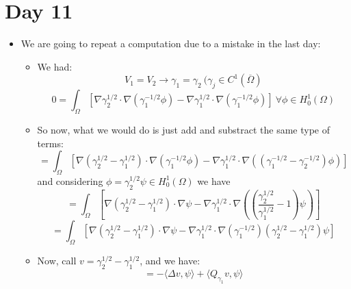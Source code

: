 \documentclass{article}
\begin{document}
\section*{Day 11}
\begin{itemize}
    \item We are going to repeat a computation due to a mistake in the last day:
    \begin{itemize}
        \item We had:
        \begin{equation}
            V_1 = V_2 \rightarrow \gamma_1 = \gamma_2 \ (\gamma_j  \in C^1(\overline{\Omega})
        \end{equation}
        \begin{equation}
            0 = \int_\Omega [\nabla \gamma^{1/2}_2 \cdot \nabla (\gamma^{-1/2}_1 \phi) - \nabla \gamma^{1/2}_1 \cdot \nabla (\gamma^{-1/2}_1 \phi) ] \ \forall \phi \in H^1_0 (\Omega)
        \end{equation}
    
        \item So now, what we would do is just add and substract the same type of terms:
        \begin{equation}
            = \int_\Omega [\nabla (\gamma^{1/2}_2 - \gamma^{1/2}_1) \cdot \nabla (\gamma^{-1/2}_1 \phi) - \nabla \gamma^{1/2}_1 \cdot \nabla ((\gamma^{-1/2}_1 - \gamma^{-1/2}_2)  \phi) ]
        \end{equation}
        and considering $\phi = \gamma_2^{1/2}\psi \in H^1_0(\Omega)$ we have
        \begin{equation}
            = \int_\Omega [\nabla (\gamma^{1/2}_2 - \gamma^{1/2}_1) \cdot \nabla \psi - \nabla \gamma^{1/2}_1 \cdot \nabla ((\frac{\gamma^{1/2}_2}{\gamma^{1/2}_1} - 1) \psi)]
        \end{equation}
        \begin{equation}
            = \int_\Omega [\nabla (\gamma^{1/2}_2 - \gamma^{1/2}_1) \cdot \nabla \psi - \nabla \gamma^{1/2}_1 \cdot \nabla (\gamma^{-1/2}_1)(\gamma^{1/2}_2 - \gamma^{1/2}_1)\psi]
        \end{equation}
    
        \item Now, call $v = \gamma^{1/2}_2 - \gamma^{1/2}_1$, and we have:
        \begin{equation}
            = - \langle \Delta v, \psi \rangle + \langle Q_{\gamma_1} v, \psi \rangle
        \end{equation}
    

\end{itemize}
\end{itemize}
\end{document}
